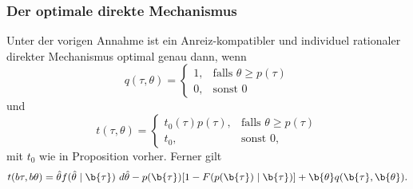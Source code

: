 \begin{frame}
  \frametitle{Der optimale direkte Mechanismus}
  \justifying
  \begin{thmS}
    Unter der vorigen Annahme ist ein Anreiz-kompatibler und individuel rationaler direkter Mechanismus optimal genau dann, wenn
    \begin{equation*}
      q(\tau, \theta) = \left\{\begin{array}{lr}
        1, & \text{falls } \theta \ge p(\tau) \\
        0, & \text{sonst } 0
        \end{array}
    \end{equation*}
    und
    \begin{equation*}
      t(\tau, \theta) = \left\{\begin{array}{lr}
        t_{0}(\tau) p(\tau), & \text{falls } \theta \ge p(\tau) \\
        t_{0}, & \text{sonst } 0,
        \end{array}
    \end{equation*}
    mit $t_{0}$ wie in Proposition vorher. Ferner gilt
    \begin{equation*}
      t(b{\tau}, b{\theta}) = \hat{\theta} f(\hat{\theta} \mid \b{\tau}) \ d \hat{\theta} - p(\b{\tau}) [1 - F(p(\b{\tau}) \mid \b{\tau})] + \b{\theta} q(\b{\tau}, \b{\theta}).
    \end{equation*}
  \end{thmS}
\end{frame}
